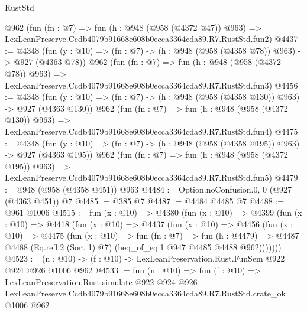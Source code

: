 \begin{lexlean}{RustStd}
\begin{coremodule}
    @962
    (fun (fn : @7) =>
    fun (h : @948 (@958 (@4372 @47)) @963) =>
    LexLeanPreserve.Ccdb4079b91668e608b0ecca3364cda89.R7.RustStd.fun2)
@4437 := @4348
    (fun (y : @10) => (fn : @7) -> (h : @948 (@958 (@4358 @78)) @963) -> @927 (@4363 @78))
    @962
    (fun (fn : @7) =>
    fun (h : @948 (@958 (@4372 @78)) @963) =>
    LexLeanPreserve.Ccdb4079b91668e608b0ecca3364cda89.R7.RustStd.fun3)
@4456 := @4348
    (fun (y : @10) => (fn : @7) -> (h : @948 (@958 (@4358 @130)) @963) -> @927 (@4363 @130))
    @962
    (fun (fn : @7) =>
    fun (h : @948 (@958 (@4372 @130)) @963) =>
    LexLeanPreserve.Ccdb4079b91668e608b0ecca3364cda89.R7.RustStd.fun4)
@4475 := @4348
    (fun (y : @10) => (fn : @7) -> (h : @948 (@958 (@4358 @195)) @963) -> @927 (@4363 @195))
    @962
    (fun (fn : @7) =>
    fun (h : @948 (@958 (@4372 @195)) @963) =>
    LexLeanPreserve.Ccdb4079b91668e608b0ecca3364cda89.R7.RustStd.fun5)
@4479 := @948 (@958 (@4358 @451)) @963
@4484 := Option.noConfusion.{0, 0} (@927 (@4363 @451)) @7
@4485 := @385 @7
@4487 := @4484 @4485 @7
@4488 := @961 @1006
@4515 := fun (x : @10) =>
  @4380
    (fun (x : @10) =>
    @4399
      (fun (x : @10) =>
      @4418
        (fun (x : @10) =>
        @4437
          (fun (x : @10) =>
          @4456
            (fun (x : @10) =>
            @4475
              (fun (x : @10) =>
              fun (fn : @7) =>
              fun (h : @4479) =>
              @4487 @4488 (Eq.refl.{2} (Sort 1) @7) (heq_of_eq.{1} @947 @4485 @4488 @962)))))))
@4523 := (n : @10) -> (f : @10) -> LexLeanPreservation.Rust.FunSem @922 @924 @926 @1006 @962
@4533 := fun (n : @10) =>
  fun (f : @10) =>
  LexLeanPreservation.Rust.simulate
    @922
    @924
    @926
    LexLeanPreserve.Ccdb4079b91668e608b0ecca3364cda89.R7.RustStd.crate_ok
    @1006
    @962
\end{coremodule}
\end{lexlean}
